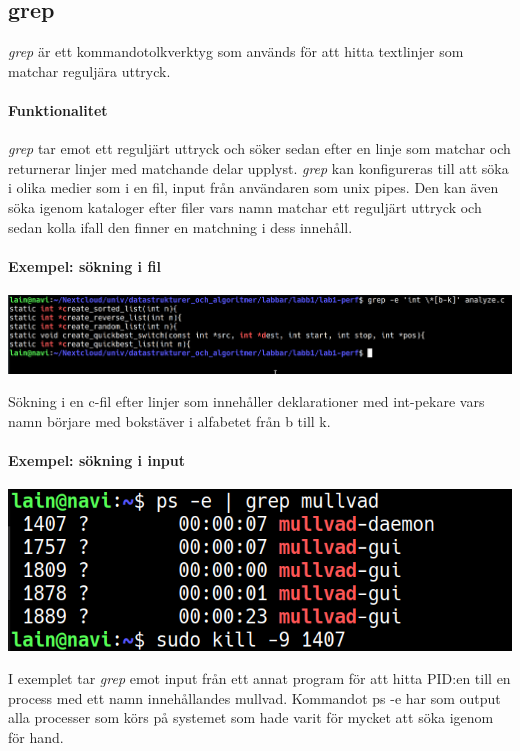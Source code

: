 \subsection{grep}
\emph{grep} är ett kommandotolkverktyg som används för att hitta textlinjer som matchar reguljära uttryck. 
\paragraph{Funktionalitet}
\emph{grep} tar emot ett reguljärt uttryck och söker sedan efter en linje som matchar och returnerar linjer med matchande delar upplyst. \emph{grep} kan konfigureras till att söka i olika medier som i en fil, input från användaren som unix pipes. Den kan även söka igenom kataloger efter filer vars namn matchar ett reguljärt uttryck och sedan kolla ifall den finner en matchning i dess innehåll.
\paragraph{Exempel: sökning i fil}
\begin{center}
        \includegraphics[width=\linewidth]{bilder/grep_sok_i_fil.png}
\end{center}
Sökning i en c-fil efter linjer som innehåller deklarationer med int-pekare vars namn börjare med bokstäver i alfabetet från b till k.
\paragraph{Exempel: sökning i input}
\begin{center}
        \includegraphics[width=\linewidth]{bilder/grep_pipes.png}
\end{center}
I exemplet tar \emph{grep} emot input från ett annat program för att hitta PID:en till en process med ett namn innehållandes mullvad. Kommandot ps -e har som output alla processer som körs på systemet som hade varit för mycket att söka igenom för hand.
